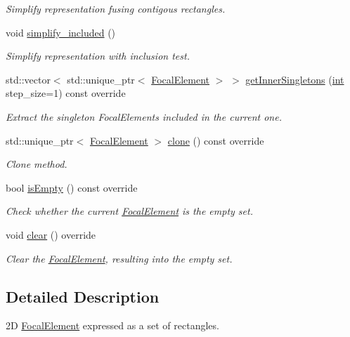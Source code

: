 \begin{DoxyCompactItemize}
\begin{DoxyCompactList}\small\item\em Simplify representation fusing contigous rectangles. \end{DoxyCompactList}\item 
void \hyperlink{classBoxSet2DFocalElement_a8e80a0fb79597dfa97e7d2d4ef49623d}{simplify\+\_\+included} ()
\begin{DoxyCompactList}\small\item\em Simplify representation with inclusion test. \end{DoxyCompactList}\item 
std\+::vector$<$ std\+::unique\+\_\+ptr$<$ \hyperlink{classFocalElement}{Focal\+Element} $>$ $>$ \hyperlink{classBoxSet2DFocalElement_afdd0db628fc45a5865c72d9f1fb3fcce}{get\+Inner\+Singletons} (\hyperlink{CMakeCache_8txt_a79a3d8790b2588b09777910863574e09}{int} step\+\_\+size=1) const override
\begin{DoxyCompactList}\small\item\em Extract the singleton Focal\+Elements included in the current one. \end{DoxyCompactList}\item 
std\+::unique\+\_\+ptr$<$ \hyperlink{classFocalElement}{Focal\+Element} $>$ \hyperlink{classBoxSet2DFocalElement_a0e325a4cad33db05c423f46eb1f346c9}{clone} () const override
\begin{DoxyCompactList}\small\item\em Clone method. \end{DoxyCompactList}\item 
bool \hyperlink{classBoxSet2DFocalElement_a7512305b698f37aa77f3acacd0626f77}{is\+Empty} () const override
\begin{DoxyCompactList}\small\item\em Check whether the current \hyperlink{classFocalElement}{Focal\+Element} is the empty set. \end{DoxyCompactList}\item 
void \hyperlink{classBoxSet2DFocalElement_a9b09d64e1511def1a20898c7e3ac7390}{clear} () override
\begin{DoxyCompactList}\small\item\em Clear the \hyperlink{classFocalElement}{Focal\+Element}, resulting into the empty set. \end{DoxyCompactList}\end{DoxyCompactItemize}


\subsection{Detailed Description}
2D \hyperlink{classFocalElement}{Focal\+Element} expressed as a set of rectangles. 

